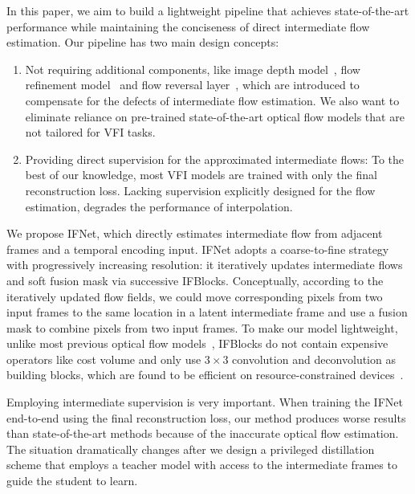 \documentclass[final]{cvpr}
\begin{document}
In this paper, we aim to build a lightweight pipeline that achieves state-of-the-art performance while maintaining the conciseness of direct intermediate flow estimation. Our pipeline has two main design concepts: \begin{enumerate}[1)] 
	\item Not requiring additional components, like image depth model~\cite{bao2019depth}, flow refinement model~\cite{jiang2018super} and flow reversal layer~\cite{xu2019quadratic}, which are introduced to compensate for the defects of intermediate flow estimation. We also want to eliminate reliance on pre-trained state-of-the-art optical flow models that are not tailored for VFI tasks. 
	\item Providing direct supervision for the approximated intermediate flows: To the best of our knowledge, most VFI models are trained with only the final reconstruction loss. Lacking supervision explicitly designed for the flow estimation, degrades the performance of interpolation.
\end{enumerate}

We propose IFNet, which directly estimates intermediate flow from adjacent frames and a temporal encoding input. IFNet adopts a coarse-to-fine strategy~\cite{ilg2017flownet} with progressively increasing resolution: it iteratively updates intermediate flows and soft fusion mask via successive IFBlocks. Conceptually, according to the iteratively updated flow fields, we could move corresponding pixels from two input frames to the same location in a latent intermediate frame and use a fusion mask to combine pixels from two input frames. To make our model lightweight, unlike most previous optical flow models~\cite{dosovitskiy2015flownet, ilg2017flownet, sun2018pwc, hui2018liteflownet, teed2020raft}, IFBlocks do not contain expensive operators like cost volume and only use $3\times3$ convolution and deconvolution as building blocks, which are found to be efficient on resource-constrained devices~\cite{ding2021repvgg}.



Employing intermediate supervision is very important. When training the IFNet end-to-end using the final reconstruction loss, our method produces worse results than state-of-the-art methods because of the inaccurate optical flow estimation. The situation dramatically changes after we design a privileged distillation scheme that employs a teacher model with access to the intermediate frames to guide the student to learn.
\end{document}
